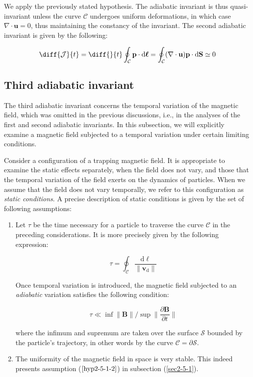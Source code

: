 We apply the previously stated hypothesis. The adiabatic invariant is thus quasi-invariant unless the curve $\mathcal{C}$ undergoes uniform deformations, in which case $\nabla\cdot\mathbf{u}=0$, thus maintaining the constancy of the invariant. The second adiabatic invariant is given by the following:

\begin{equation}
    \diff{\mathcal{J}}{t}=\diff{}{t}\oint_\mathcal{C}\mathbf{p}\cdot\mathrm{d}\boldsymbol{\ell}=\oint_\mathcal{C}(\nabla\cdot\mathbf{u})\mathbf{p}\cdot\mathrm{d}\mathbf{S}\simeq0
\end{equation}

\subsection{Third adiabatic invariant}

The third adiabatic invariant concerns the temporal variation of the magnetic field, which was omitted in the previous discussions, i.e., in the analyses of the first and second adiabatic invariants. In this subsection, we will explicitly examine a magnetic field subjected to a temporal variation under certain limiting conditions.

\quad Consider a configuration of a trapping magnetic field. It is appropriate to examine the static effects separately, when the field does not vary, and those that the temporal variation of the field exerts on the dynamics of particles. When we assume that the field does not vary temporally, we refer to this configuration as \textit{static conditions}. A precise description of static conditions is given by the set of following assumptions:

\begin{enumerate}
    \item\label{hyp2-9-3-1} Let $\tau$ be the time necessary for a particle to traverse the curve $\mathcal{C}$ in the preceding considerations. It is more precisely given by the following expression:

    \begin{equation}
        \tau=\oint_\mathcal{C}\frac{\mathrm{d}\ell}{\|\mathbf{v}_\mathrm{d}\|}
    \end{equation}

    Once temporal variation is introduced, the magnetic field subjected to an \textit{adiabatic} variation satisfies the following condition:

    \begin{equation}
        \tau\ll\inf\|\mathbf{B}\|\bigg/\sup\bigg\|\frac{\partial\mathbf{B}}{\partial t}\bigg\|
    \end{equation}

    where the infimum and supremum are taken over the surface $\mathcal{S}$ bounded by the particle's trajectory, in other words by the curve $\mathcal{C}=\partial\mathcal{S}$.
    \item\label{hyp2-9-3-2} The uniformity of the magnetic field in space is very stable. This indeed presents assumption ($\ref{hyp2-5-1-2}$) in subsection (\ref{sec2-5-1}).
\end{enumerate}

